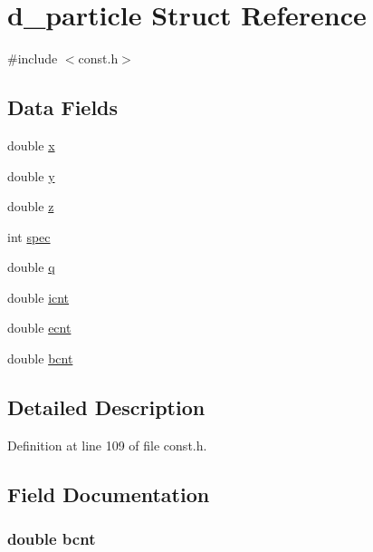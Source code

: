 \hypertarget{structd__particle}{}\section{d\+\_\+particle Struct Reference}
\label{structd__particle}


{\ttfamily \#include $<$const.\+h$>$}

\subsection*{Data Fields}
\begin{DoxyCompactItemize}
\item 
double \hyperlink{structd__particle_af88b946fb90d5f08b5fb740c70e98c10}{x}
\item 
double \hyperlink{structd__particle_ab927965981178aa1fba979a37168db2a}{y}
\item 
double \hyperlink{structd__particle_ab3e6ed577a7c669c19de1f9c1b46c872}{z}
\item 
int \hyperlink{structd__particle_ad0a8d17b47e34dc1972f90ce3ed67780}{spec}
\item 
double \hyperlink{structd__particle_a5b5e3f03e443adea974601f295136638}{q}
\item 
double \hyperlink{structd__particle_aa2372309226aad25e93f477929fa8ff1}{icnt}
\item 
double \hyperlink{structd__particle_a7e8b5e70f50ad3c740d069f4e9e658a9}{ecnt}
\item 
double \hyperlink{structd__particle_a27c593b0c02cb9ca91197a58b2c0f1c6}{bcnt}
\end{DoxyCompactItemize}


\subsection{Detailed Description}


Definition at line 109 of file const.\+h.



\subsection{Field Documentation}
\hypertarget{structd__particle_a27c593b0c02cb9ca91197a58b2c0f1c6}{}
\subsubsection[{bcnt}]{\setlength{\rightskip}{0pt plus 5cm}double bcnt}\label{structd__particle_a27c593b0c02cb9ca91197a58b2c0f1c6}


